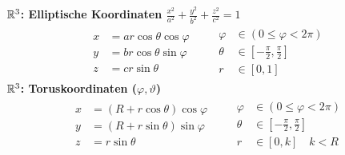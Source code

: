 \documentclass[a4paper]{article}
\begin{document}
	\begin{multicols}{2}
		\textbf{$\mathbb{R}^3$: Elliptische Koordinaten $\frac{x^2}{a^2} +\frac{y^2}{b^2} +\frac{z^2}{c^2} = 1$}
			\begin{eqnarray*}
				\begin{aligned}
					x &= a r \cos \theta \cos\varphi \\ 
					y &= b r\cos \theta \sin\varphi\\
					z &= c r \sin \theta
				\end{aligned}
					&\ &
				\begin{aligned} 
					\varphi &\in (0 \le \varphi < 2 \pi)\\
					\theta &\in \left[-\frac{\pi}{2},\frac{\pi}{2}\right]\\
					r &\in [0,1]
				\end{aligned}
			\end{eqnarray*}
		\textbf{$\mathbb{R}^3$: Toruskoordinaten ($\varphi, \vartheta$)}
			\begin{eqnarray*}
				\begin{aligned}
					x &= (R+r\cos \theta )\cos \varphi \\ 
					y &= (R+r\sin \theta) \sin \varphi \\
					z &= r \sin \theta
				\end{aligned}
					&\ &
				\begin{aligned} 
					\varphi &\in (0 \le \varphi < 2 \pi)\\
					\theta &\in \left[-\frac{\pi}{2},\frac{\pi}{2}\right]\\
					r &\in [0,k] \quad k < R
				\end{aligned}
			\end{eqnarray*}
    \end{multicols}
\end{document}
